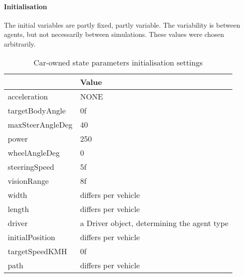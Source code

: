 \paragraph{Initialisation}
\label{par:method:model:details:initialization}

The initial variables are partly fixed, partly variable. The variability is between agents, but not necessarily between simulations. These values were chosen arbitrarily.


\begin{table}[H]
	\centering
	\begin{tabular}{| >{\ttfamily}l | p{10.5cm} |}
		\hline
		\normalfont{Parameter}	& Value \\ \hline \hline
		acceleration 			& NONE \\ \hline
		targetBodyAngle 		& 0f \\ \hline
		maxSteerAngleDeg 		& 40 \\ \hline
		power 					& 250 \\ \hline
		wheelAngleDeg 			& 0 \\ \hline
		steeringSpeed 			& 5f \\ \hline
		visionRange 			& 8f \\ \hline
		width 					& differs per vehicle \\ \hline
		length 					& differs per vehicle \\ \hline
		driver 					& a Driver object, determining the agent type \\ \hline
		initialPosition 		& differs per vehicle \\ \hline
		targetSpeedKMH			& 0f \\ \hline
		path					& differs per vehicle \\ \hline
	\end{tabular}
	\caption{Car-owned state parameters initialisation settings}
	\label{tab:par:method:model:details:init:car:value}
\end{table} 

